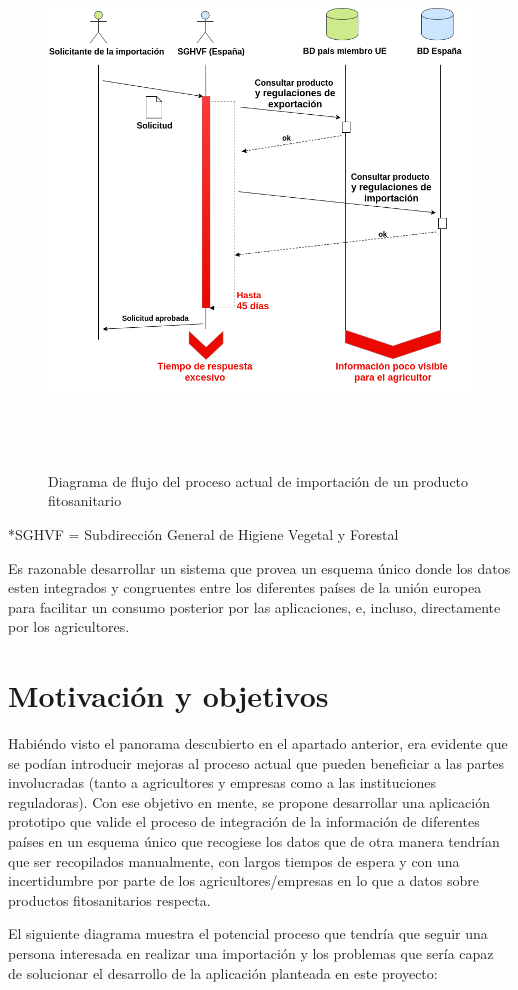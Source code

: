 \begin{figure}[!h]
    \centering
    \includegraphics[width=1\textwidth,height=14cm]{Imagenes/Diagrama_de_flujo_proceso_actual_de_importacion_producto_fitosanitario}
    \caption{Diagrama de flujo del proceso actual de importación de un producto fitosanitario}
    \label{fig:flujo_actual_importacion}
\end{figure}
\par
*SGHVF = Subdirección General de Higiene Vegetal y Forestal\\\par
Es razonable desarrollar un sistema que provea un esquema único donde los datos esten integrados y congruentes entre los diferentes países de la unión europea para facilitar un consumo posterior por las aplicaciones, e, incluso, directamente por los agricultores. 

\section{Motivación y objetivos} \label{phytoscheme.motivacion}
Habiéndo visto el panorama descubierto en el apartado anterior, era evidente que se podían introducir mejoras al proceso actual que pueden beneficiar a las partes involucradas (tanto a agricultores y empresas como a las instituciones reguladoras). Con ese objetivo en mente, se propone desarrollar una aplicación prototipo que valide el proceso de integración de la información de diferentes países en un esquema único que recogiese los datos que de otra manera tendrían que ser recopilados manualmente, con largos tiempos de espera y con una incertidumbre por parte de los agricultores/empresas en lo que a datos sobre productos fitosanitarios respecta.\par 
El siguiente diagrama muestra el potencial proceso que tendría que seguir una persona interesada en realizar una importación y los problemas que sería capaz de solucionar el desarrollo de la aplicación planteada en este proyecto:

